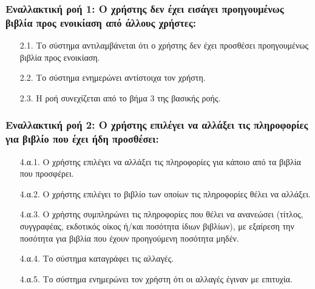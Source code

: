 \documentclass[12pt,a4paper]{article}
\begin{document}
\subsubsection*{Εναλλακτική ροή 1: Ο χρήστης δεν έχει εισάγει προηγουμένως βιβλία προς ενοικίαση από άλλους χρήστες:}
\begin{enumerate}
    \item [2.1.] Το σύστημα αντιλαμβάνεται ότι ο χρήστης δεν έχει προσθέσει προηγουμένως βιβλία προς ενοικίαση.
    \item [2.2.] Το σύστημα ενημερώνει αντίστοιχα τον χρήστη.
    \item [2.3.] Η ροή συνεχίζεται από το βήμα 3 της βασικής ροής.
\end{enumerate}

\subsubsection*{Εναλλακτική ροή 2: Ο χρήστης επιλέγει να αλλάξει τις πληροφορίες για βιβλίο που έχει ήδη προσθέσει:}
\begin{enumerate}
    \item [4.α.1.] Ο χρήστης επιλέγει να αλλάξει τις πληροφορίες για κάποιο από τα βιβλία που προσφέρει.
    \item [4.α.2.] Ο χρήστης επιλέγει το βιβλίο των οποίων τις πληροφορίες θέλει να αλλάξει.

    \item [4.α.3.] Ο χρήστης συμπληρώνει τις πληροφορίες που θέλει να ανανεώσει (τίτλος, συγγραφέας, εκδοτικός οίκος ή/και ποσότητα ίδιων βιβλίων), με εξαίρεση την ποσότητα για βιβλία που έχουν προηγούμενη ποσότητα μηδέν.

    \item [4.α.4.] Το σύστημα καταγράφει τις αλλαγές.
    \item [4.α.5.] Το σύστημα ενημερώνει τον χρήστη ότι οι αλλαγές έγιναν με επιτυχία.
\end{enumerate}
\end{document}

